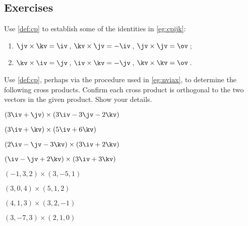 





\subsection{Exercises}


\begin{exercise} \label{ex:cpijk} 
Use \autoref{def:cp} to establish some of the  identities in \autoref{eg:cpijk}: 
\begin{enumerate}
\item \(\jv\times\kv=\iv\)\,, \(\kv\times\jv=-\iv\)\,, \(\jv\times\jv=\ov\)\,;
\item \(\kv\times\iv=\jv\)\,, \(\iv\times\kv=-\jv\)\,, \(\kv\times\kv=\ov\)\,.
\end{enumerate}
\end{exercise}





\begin{exercise} \label{ex:} 
Use \autoref{def:cp}, perhaps via the procedure used in \autoref{eg:nviax}, to determine the following cross products. 
Confirm each cross product is orthogonal to the two vectors in the given product.
Show your details.
\begin{parts}
\item \((3\iv+\jv)\times(3\iv -3\jv -2\kv)\)
\answer{\(-2\iv +6\jv -12\kv\)}
\item \((3\iv  +\kv)\times(5\iv +6 \kv)\)
\answer{\(-13\jv\)}
\item \((2\iv-\jv -3\kv)\times(3\iv +2\kv)\)
\answer{\(-2\iv -13\jv +3\kv\)}
\item \((\iv -\jv +2\kv)\times(3\iv  +3\kv)\)
\answer{\(-3\iv +3\jv +3\kv\)}
\item \((-1,3,2)\times(3,-5,1)\)
\item \((3,0,4)\times(5,1,2)\)
\item \((4,1,3)\times(3,2,-1)\)
\item \((3,-7,3)\times(2,1,0)\)
\end{parts}
\end{exercise}





